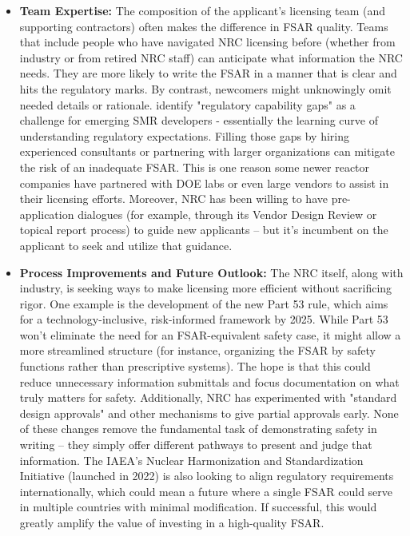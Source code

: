 \documentclass[5p,authoryear]{elsarticle}
\begin{document}
\begin{itemize}
    \item \textbf{Team Expertise:} The composition of the applicant’s licensing team (and supporting contractors) often makes the difference in FSAR quality. Teams that include people who have navigated NRC licensing before (whether from industry or from retired NRC staff) can anticipate what information the NRC needs. They are more likely to write the FSAR in a manner that is clear and hits the regulatory marks. By contrast, newcomers might unknowingly omit needed details or rationale. \cite{Sam2023} identify "regulatory capability gaps" as a challenge for emerging SMR developers - essentially the learning curve of understanding regulatory expectations. Filling those gaps by hiring experienced consultants or partnering with larger organizations can mitigate the risk of an inadequate FSAR. This is one reason some newer reactor companies have partnered with DOE labs or even large vendors to assist in their licensing efforts. Moreover, NRC has been willing to have pre-application dialogues (for example, through its Vendor Design Review or topical report process) to guide new applicants – but it’s incumbent on the applicant to seek and utilize that guidance. 
    \item \textbf{Process Improvements and Future Outlook:} The NRC itself, along with industry, is seeking ways to make licensing more efficient without sacrificing rigor. One example is the development of the new Part 53 rule, which aims for a technology-inclusive, risk-informed framework by 2025. While Part 53 won't eliminate the need for an FSAR-equivalent safety case, it might allow a more streamlined structure (for instance, organizing the FSAR by safety functions rather than prescriptive systems). The hope is that this could reduce unnecessary information submittals and focus documentation on what truly matters for safety. Additionally, NRC has experimented with "standard design approvals" and other mechanisms to give partial approvals early. None of these changes remove the fundamental task of demonstrating safety in writing – they simply offer different pathways to present and judge that information. The IAEA’s Nuclear Harmonization and Standardization Initiative (launched in 2022) is also looking to align regulatory requirements internationally, which could mean a future where a single FSAR could serve in multiple countries with minimal modification. If successful, this would greatly amplify the value of investing in a high-quality FSAR. 

\end{itemize}
\end{document}
